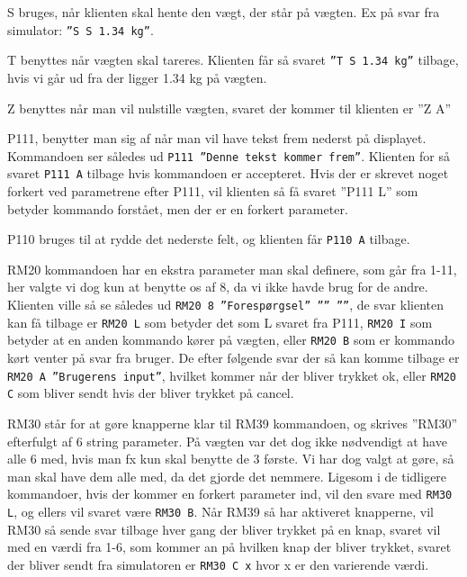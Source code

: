 \documentclass[a4paper]{article}
\newenvironment{my_itemize}
{\begin{itemize}
  \setlength{\itemsep}{1pt}
  \setlength{\parskip}{0pt}
  \setlength{\parsep}{0pt}}
{\end{itemize}}
\begin{document}
\begin{my_itemize}
  \item	S bruges, når klienten skal hente den vægt, der står på vægten. Ex på svar fra simulator: \texttt{”S S       1.34 kg”}.

  \item	T benyttes når vægten skal tareres. Klienten får så svaret \texttt{”T S       1.34 kg”} tilbage, hvis vi går ud fra der ligger 1.34 kg på vægten.

  \item Z benyttes når man vil nulstille vægten, svaret der kommer til klienten er ”Z A”

  \item P111, benytter man sig af når man vil have tekst frem nederst på displayet. Kommandoen ser således ud \texttt{P111 ”Denne tekst kommer frem”}. Klienten for så svaret \texttt{P111 A} tilbage hvis kommandoen er accepteret. Hvis der er skrevet noget forkert ved parametrene efter P111, vil klienten så få svaret ”P111 L” som betyder kommando forstået, men der er en forkert parameter.

  \item	P110 bruges til at rydde det nederste felt, og klienten får \texttt{P110 A} tilbage.

  \item RM20 kommandoen har en ekstra parameter man skal definere, som går fra 1-11, her valgte vi dog kun at benytte os af 8, da vi ikke havde brug for de andre. Klienten ville så se således ud 
    \texttt{RM20 8 ”Forespørgsel” ”” ””}, de svar klienten kan få tilbage er \texttt{RM20 L} som betyder det som L svaret fra P111, \texttt{RM20 I} som betyder at en anden kommando kører på vægten, eller \texttt{RM20 B} som er kommando kørt venter på svar fra bruger. De efter følgende svar der så kan komme tilbage er \texttt{RM20 A ”Brugerens input”}, hvilket kommer når der bliver trykket ok, eller \texttt{RM20 C} som bliver sendt hvis der bliver trykket på cancel.

  \item	RM30 står for at gøre knapperne klar til RM39 kommandoen, og skrives ”RM30” efterfulgt af 6 string parameter. På vægten var det dog ikke nødvendigt at have alle 6 med, hvis man fx kun skal benytte de 3 første. Vi har dog valgt at gøre, så man skal have dem alle med, da det gjorde det nemmere. Ligesom i de tidligere kommandoer, hvis der kommer en forkert parameter ind, vil den svare med \texttt{RM30 L}, og ellers vil svaret være \texttt{RM30 B}. Når RM39 så har aktiveret knapperne, vil RM30 så sende svar tilbage hver gang der bliver trykket på en knap, svaret vil med en værdi fra 1-6, som kommer an på hvilken knap der bliver trykket, svaret der bliver sendt fra simulatoren er \texttt{RM30 C x} hvor x er den varierende værdi.


\end{my_itemize}
\end{document}
